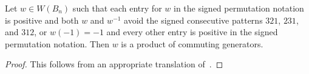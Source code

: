 \begin{proposition}\label{lem:prodofcommA}
Let $w \in W(B_n)$ such that each entry for $w$ in the signed permutation notation is positive and both $w$ and $w^{-1}$ avoid the signed consecutive patterns $321$, $231$, and $312$, or $w(-1)=-1$ and every other entry is positive in the signed permutation notation. Then $w$ is a product of commuting generators.
\begin{proof}
	This follows from an appropriate translation of~\cite[Lemma 2.2.9]{Gern2013a}.
\end{proof}	
\end{proposition}

%	
%	

